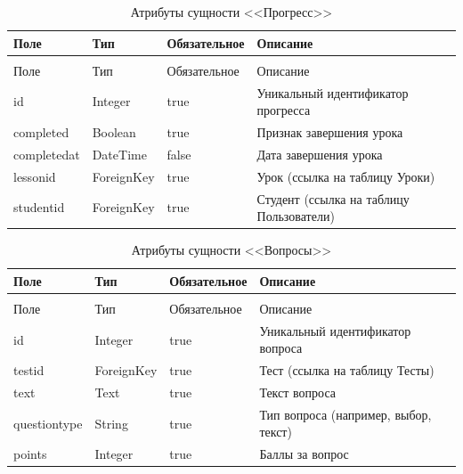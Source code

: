 \begin{xltabular}{\textwidth}{|l|l|p{3.2cm}|X|}
	\caption{Атрибуты сущности <<Прогресс>>\label{progress:table}}\\ \hline
	Поле & Тип & Обязательное & Описание \\ \hline
	\endfirsthead
	\\ \hline
	Поле & Тип & Обязательное & Описание \\ \hline
	\endhead
	id & Integer & true & Уникальный идентификатор прогресса \\ \hline
	completed & Boolean & true & Признак завершения урока \\ \hline
	completedat & DateTime & false & Дата завершения урока \\ \hline
	lessonid & ForeignKey & true & Урок (ссылка на таблицу Уроки) \\ \hline
	studentid & ForeignKey & true & Студент (ссылка на таблицу Пользователи) \\ \hline
\end{xltabular}

\begin{xltabular}{\textwidth}{|l|l|p{3.2cm}|X|}
	\caption{Атрибуты сущности <<Вопросы>>\label{questions:table}}\\ \hline
	Поле & Тип & Обязательное & Описание \\ \hline
	\endfirsthead
	\\ \hline
	Поле & Тип & Обязательное & Описание \\ \hline
	\endhead
	id & Integer & true & Уникальный идентификатор вопроса \\ \hline
	testid & ForeignKey & true & Тест (ссылка на таблицу Тесты) \\ \hline
	text & Text & true & Текст вопроса \\ \hline
	questiontype & String & true & Тип вопроса (например, выбор, текст) \\ \hline
	points & Integer & true & Баллы за вопрос \\ \hline
\end{xltabular}


